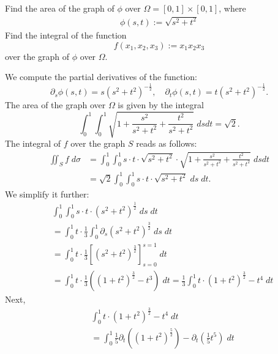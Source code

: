 \documentclass[11pt]{article}
\begin{document}
\begin{exercise}
    Find the area of the graph of $\phi$ over $\Omega = [0,1] \times [0,1]$, where 
    \begin{gather*}
        \phi(s,t) := \sqrt{ s^2 + t^2 }
    \end{gather*}
    Find the integral of the function 
    \[
        f(x_{1},x_{2},x_3) := x_{1} x_{2} x_3
    \]
    over the graph of $\phi$ over $\Omega$. 
\end{exercise}
\begin{solution}
    We compute the partial derivatives of the function:
    \[
        \partial_s \phi(s,t) = s ( s^2 + t^2 )^{- \frac 1 2},
        \quad 
        \partial_t \phi(s,t) = t ( s^2 + t^2 )^{- \frac 1 2}.
    \]
    The area of the graph over $\Omega$ is given by the integral 
    \[
        \int_0^1 \int_0^1 \sqrt{ 1 + \frac{ s^2 }{ s^2 + t^2 } + \frac{ t^2 }{ s^2 + t^2 } } \;dsdt = \sqrt{2}.
    \]
    The integral of $f$ over the graph $S$ reads as follows:
    \begin{align*}
        \iint_S f \;d\sigma
        &=
        \int_0^1 \int_0^1 s \cdot t \cdot \sqrt{ s^2 + t^2 } \cdot \sqrt{ 1 + \frac{ s^2 }{ s^2 + t^2 } + \frac{ t^2 }{ s^2 + t^2 } } \;dsdt
        \\&=
        \sqrt{2}
        \int_0^1 \int_0^1 s \cdot t \cdot \sqrt{ s^2 + t^2 } \;ds \;dt.
    \end{align*}
    We simplify it further:
    \begin{align*}
        &
        \int_0^1 \int_0^1 s \cdot t \cdot \left( s^2 + t^2 \right)^{\frac 1 2} \;ds \;dt
        \\&
        =
        \int_0^1 t \cdot \frac 1 3 \int_0^1 \partial_s ( s^2 + t^2 )^{\frac 3 2} \;ds \;dt
        \\&
        =
        \int_0^1 t \cdot \frac 1 3 \left[ ( s^2 + t^2 )^{\frac 3 2} \right]_{s=0}^{s=1} \;dt
        \\&
        =
        \int_0^1 t \cdot \frac 1 3 \left( ( 1 + t^2 )^{\frac 3 2} - t^{3} \right) \;dt
        =
        \frac 1 3 
        \int_0^1 t \cdot ( 1 + t^2 )^{\frac 3 2} - t^{4} \;dt
    \end{align*}
    Next, 
    \begin{align*}
        &
        \int_0^1 t \cdot ( 1 + t^2 )^{\frac 3 2} - t^{4} \;dt
        \\&
        =
        \int_0^1 
        \frac 1 5 \partial_t \left( \left( 1 + t^2 \right)^{\frac 5 2} \right) - \partial_t \left( \frac 1 5 t^{5} \right) 
        \;dt

\end{align*}
\end{solution}
\end{document}
